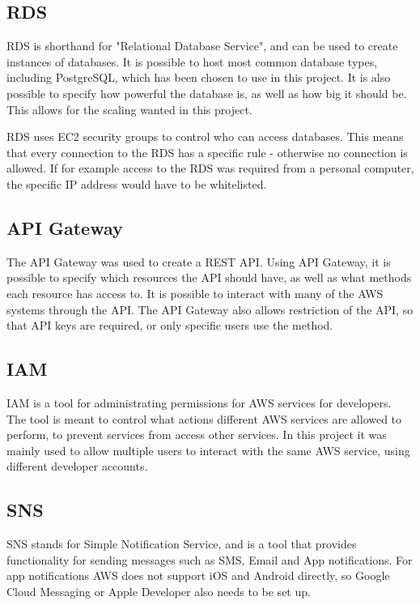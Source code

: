 \subsection{RDS}
RDS is shorthand for "Relational Database Service", and can be used to create instances of databases. It is possible to host most common database types, including PostgreSQL, which has been chosen to use in this project. It is also possible to specify how powerful the database is, as well as how big it should be. This allows for the scaling wanted in this project.

RDS uses EC2 security groups to control who can access databases. This means that every connection to the RDS has a specific rule - otherwise no connection is allowed. If for example access to the RDS was required from a personal computer, the specific IP address would have to be whitelisted.


\subsection{API Gateway}
The API Gateway was used to create a REST API. Using API Gateway, it is possible to specify which resources the API should have, as well as what methods each resource has access to. It is possible to interact with many of the AWS systems through the API. The API Gateway also allows restriction of the API, so that API keys are required, or only specific users use the method.

\subsection{IAM}
IAM is a tool for administrating permissions for AWS services for developers. The tool is meant to control what actions different AWS services are allowed to perform, to prevent services from access other services. In this project it was mainly used to allow multiple users to interact with the same AWS service, using different developer accounts.


\subsection{SNS}
SNS stands for Simple Notification Service, and is a tool that provides functionality for sending messages such as SMS, Email and App notifications. For app notifications AWS does not support iOS and Android directly, so Google Cloud Messaging or Apple Developer also needs to be set up.

